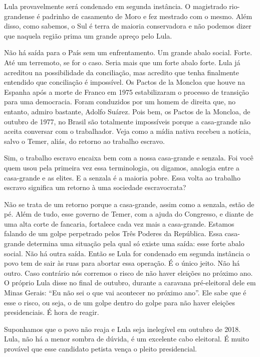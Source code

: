  Lula provavelmente será condenado em segunda instância. O magistrado
rio-grandense é padrinho de casamento de Moro e fez mestrado com o
mesmo. Além disso, como sabemos, o Sul é terra de maioria conservadora e
não podemos dizer que naquela região prima um grande apreço pelo Lula.

 Não há saída para o País sem um enfrentamento. Um grande abalo
social. Forte. Até um terremoto, se for o caso. Seria mais que um forte
abalo forte. Lula já acreditou na possibilidade da conciliação, mas
acredito que tenha finalmente entendido que conciliação é impossível. Os
Pactos de la Moncloa que houve na Espanha após a morte de Franco em 1975
estabilizaram o processo de transição para uma democracia. Foram
conduzidos por um homem de direita que, no entanto, admiro bastante,
Adolfo Suárez. Pois bem, os Pactos de la Moncloa, de outubro de 1977, no
Brasil são totalmente impossíveis porque a casa-grande não aceita
conversar com o trabalhador. Veja como a mídia nativa recebeu a notícia,
salvo o Temer, aliás, do retorno ao trabalho escravo.

 Sim, o trabalho escravo encaixa bem com a nossa casa-grande e
senzala. Foi você quem usou pela primeira vez essa terminologia, ou
digamos, analogia entre a casa-grande e as elites. E a senzala é a
maioria pobre. Essa volta ao trabalho escravo significa um retorno à uma
sociedade escravocrata?

 Não se trata de um retorno porque a casa-grande, assim como a
senzala, estão de pé. Além de tudo, esse governo de Temer, com a ajuda
do Congresso, e diante de uma alta corte de fancaria, fortalece cada vez
mais a casa-grande. Estamos falando de um golpe perpetrado pelos Três
Poderes da República. Essa casa-grande determina uma situação pela qual
só existe uma saída: esse forte abalo social. Não há outra saída. Então
se Lula for condenado em segunda instância o povo tem de sair às ruas
para abortar essa operação. É o único jeito. Não há outro. Caso
contrário nós corremos o risco de não haver eleições no próximo ano. O
próprio Lula disse no final de outubro, durante a caravana pré-eleitoral
dele em Minas Gerais: ``Eu não sei o que vai acontecer no próximo ano''.
Ele sabe que é esse o risco, ou seja, o de um golpe dentro do golpe para
não haver eleições presidenciais. É hora de reagir.

 Suponhamos que o povo não reaja e Lula seja inelegível em outubro de
2018. Lula, não há a menor sombra de dúvida, é um excelente cabo
eleitoral. É muito provável que esse candidato petista vença o pleito
presidencial.


